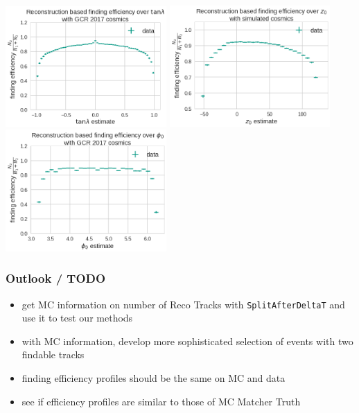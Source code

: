 \documentclass[18pt]{beamer}
\begin{document}
  \begin{frame}
    \begin{center}
      \includegraphics[width=0.46\textwidth]{figures/findeff_tan_lambda_data.png}
      \includegraphics[width=0.46\textwidth]{figures/findeff_z0_data.png}\\
      \includegraphics[width=0.46\textwidth]{figures/findeff_phi0_data.png}
    \end{center}
  \end{frame}
  

  \begin{frame}
    \frametitle{Outlook / TODO}
    \begin{itemize}
    \item get MC information on number of Reco Tracks with \texttt{SplitAfterDeltaT} and use it to test our methods
    \item with MC information, develop more sophisticated selection of events with two findable tracks
    \item finding efficiency profiles should be the same on MC and data
    \item see if efficiency profiles are similar to those of MC Matcher Truth
    \end{itemize}
  \end{frame}
\end{document}
